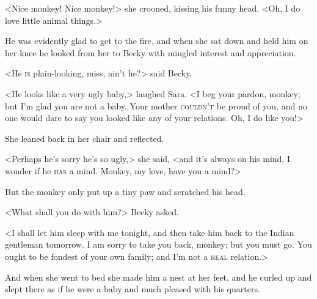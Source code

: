 <Nice monkey! Nice monkey!> she crooned, kissing his funny head. <Oh, I do love little animal things.>

He was evidently glad to get to the fire, and when she sat down and held him on her knee he looked from her to Becky with mingled interest and appreciation.

<He \textsc{is} plain-looking, miss, ain't he?> said Becky.

<He looks like a very ugly baby,> laughed Sara. <I beg your pardon, monkey; but I'm glad you are not a baby. Your mother \textsc{couldn't} be proud of you, and no one would dare to say you looked like any of your relations. Oh, I do like you!>

She leaned back in her chair and reflected.

<Perhaps he's sorry he's so ugly,> she said, <and it's always on his mind. I wonder if he \textsc{has} a mind. Monkey, my love, have you a mind?>

But the monkey only put up a tiny paw and scratched his head.

<What shall you do with him?> Becky asked.

<I shall let him sleep with me tonight, and then take him back to the Indian gentleman tomorrow. I am sorry to take you back, monkey; but you must go. You ought to be fondest of your own family; and I'm not a \textsc{real} relation.>

And when she went to bed she made him a nest at her feet, and he curled up and slept there as if he were a baby and much pleased with his quarters.
